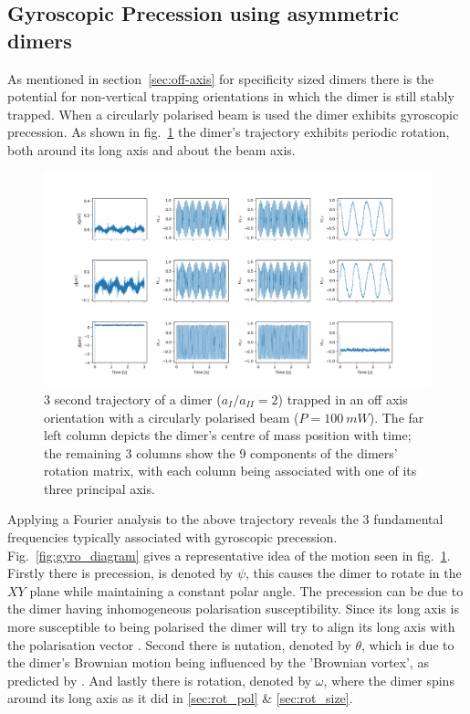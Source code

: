\subsection{Gyroscopic Precession using asymmetric dimers}
As mentioned in section~\ref{sec:off-axis} for specificity sized 
dimers there is the potential for non-vertical trapping orientations 
in which the dimer is still stably trapped. When a circularly 
polarised beam is used the dimer exhibits gyroscopic precession. 
As shown in fig.~\ref{fig:gyro} the dimer's trajectory exhibits 
periodic rotation, both around its long axis and about the beam 
axis.
\begin{figure}[h]
	\centering
	\includegraphics[width=\linewidth]{gyroscopic_precession.png}
	\caption{3 second trajectory of a dimer ($a_{I}/a_{II}=2$) trapped 
		in an off axis orientation with a circularly polarised beam 
		($P= 100\ mW$). The far left column depicts the dimer's centre 
		of mass position with time; the remaining 3 columns show the 9
		components of the dimers' rotation matrix, with each column being
		associated with one of its three principal axis. }
	\label{fig:gyro}
\end{figure}

Applying a Fourier analysis to the above trajectory reveals 
the 3 fundamental frequencies typically associated with 
gyroscopic precession. Fig.~\ref{fig:gyro_diagram} gives 
a representative idea of the motion seen in fig.~\ref{fig:gyro}.
Firstly there is precession, is denoted by $\psi$, this
causes the dimer to rotate in the $XY$ plane while maintaining
a constant polar angle. The precession can be due to the dimer 
having inhomogeneous polarisation susceptibility. Since its 
long axis is more susceptible to being polarised the dimer will
try to align its long axis with the polarisation vector 
\cite{Bruce2020}. Second there is nutation, denoted by $\theta$, 
which is due to the dimer's Brownian motion being influenced by 
the 'Brownian vortex', as predicted by \cite{Ruffner2012}. And 
lastly there is rotation, denoted by $\omega$, where the dimer
spins around its long axis as it did in \ref{sec:rot_pol} \&
\ref{sec:rot_size}.
 
